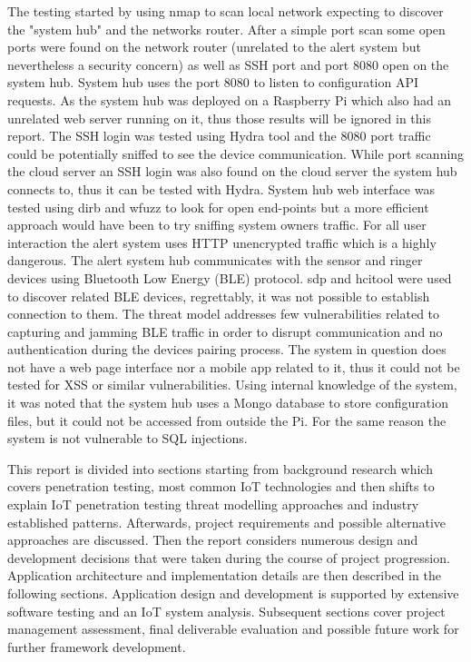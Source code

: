 	
The testing started by using nmap to scan local network expecting to discover the "system hub" and the networks router. After a simple port scan some open ports were found on the network router (unrelated to the alert system but nevertheless a security concern) as well as SSH port and port 8080 open on the system hub. System hub uses the port 8080 to listen to configuration API requests. As the system hub was deployed on a Raspberry Pi which also had an unrelated web server running on it, thus those results will be ignored in this report. The SSH login was tested using Hydra tool and the 8080 port traffic could be potentially sniffed to see the device communication. While port scanning the cloud server an SSH login was also found on the cloud server the system hub connects to, thus it can be tested with Hydra. System hub web interface was tested using dirb and wfuzz to look for open end-points but a more efficient approach would have been to try sniffing system owners traffic. For all user interaction the alert system uses HTTP unencrypted traffic which is a highly dangerous.
The alert system hub communicates with the sensor and ringer devices using Bluetooth Low Energy (BLE) protocol. sdp and hcitool were used to discover related BLE devices, regrettably, it was not possible to establish connection to them. The threat model addresses few vulnerabilities related to capturing and jamming BLE traffic in order to disrupt communication and no authentication during the devices pairing process.
The system in question does not have a web page interface nor a mobile app related to it, thus it could not be tested for XSS or similar vulnerabilities. Using internal knowledge of the system, it was noted that the system hub uses a Mongo database to store configuration files, but it could not be accessed from outside the Pi. For the same reason the system is not vulnerable to SQL injections. 
	
	

This report is divided into sections starting from background research which covers penetration testing, most common IoT technologies and then shifts to explain IoT penetration testing threat modelling approaches and industry established patterns. Afterwards, project requirements and possible alternative approaches are discussed. Then the report considers numerous design and development decisions that were taken during the course of project progression. Application architecture and implementation details are then described in the following sections. Application design and development is supported by extensive software testing and an IoT system analysis. Subsequent sections cover project management assessment, final deliverable evaluation and possible future work for further framework development.
